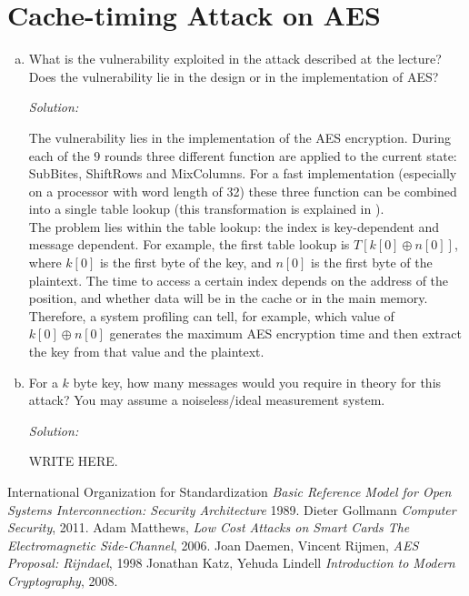 \documentclass[a4paper,11pt]{article}
\newcommand{\includeonlyinsolution}[1]{\ifsolution#1\fi}
\newenvironment{solution}%
{\par{\noindent\small\textit{Solution:}}\vspace{-12pt}\begin{framed}}%
{\end{framed}\par}
\begin{document}
\section{Cache-timing Attack on AES}
\begin{enumerate}[(a)]
\item What is the vulnerability exploited in the attack described at the
  lecture? Does the vulnerability lie in the design or in the implementation of AES?
\includeonlyinsolution{\begin{solution}
  The vulnerability lies in the implementation of the AES encryption. During each of the
  $9$ rounds three different function are applied to the current state: SubBites, ShiftRows
  and MixColumns. For a fast implementation (especially on a processor with word length
  of 32) these three function can be combined into a single table lookup (this transformation
  is explained in \cite{Rijndael}).\\
  The problem lies within the table lookup: the index is key-dependent and message dependent.
  For example, the first table lookup is $T[k[0] \oplus n[0]]$, where $k[0]$ is the first byte
  of the key, and $n[0]$ is the first byte of the plaintext. The time to access a certain index
  depends on the address of the position, and whether data will be in the cache or in the main
  memory.\\
  Therefore, a system profiling can tell, for example, which value of $k[0] \oplus n[0]$ generates the maximum
  AES encryption time and then extract the key from that value and the plaintext.

\end{solution}}

\item For a $k$ byte key, how many messages would you require in theory for
  this attack? You may assume a noiseless/ideal measurement system.
\includeonlyinsolution{\begin{solution}
WRITE HERE.
\end{solution}}
\end{enumerate}

\begin{thebibliography}{1}

   International Organization for Standardization
    {\em Basic Reference Model for Open Systems Interconnection:
    Security Architecture}  1989.
   Dieter Gollmann {\em Computer Security}, 2011.
   Adam Matthews, {\em Low Cost Attacks on Smart Cards
  The Electromagnetic Side-Channel}, 2006.
   Joan Daemen, Vincent Rijmen, {\em AES Proposal: Rijndael}, 1998
   Jonathan Katz, Yehuda Lindell {\em Introduction to Modern Cryptography}, 2008.
\end{thebibliography}
\end{document}
